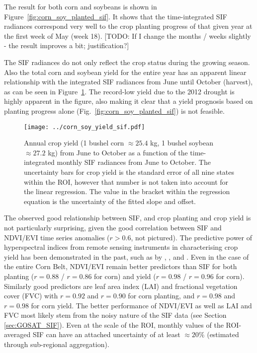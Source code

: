 \documentclass[preprint, a4paper, 10pt, times]{elsarticle}
\begin{document}
The result for both corn and soybeans is shown in Figure~\ref{fig:corn_soy_planted_sif}. It shows that the time-integrated SIF radiances correspond very well to the crop planting progress of that given year at the first week of May (week 18). [TODO: If I change the months / weeks slightly - the result improves a bit; justification?]

The SIF radiances do not only reflect the crop status during the growing season. Also the total corn and soybean yield for the entire year has an apparent linear relationship with the integrated SIF radiances from June until October (harvest), as can be seen in Figure~\ref{fig:corn_soy_yield_sif}. The record-low yield due to the 2012 drought is highly apparent in the figure, also making it clear that a yield prognosis based on planting progress alone (Fig.~\ref{fig:corn_soy_planted_sif}) is not feasible.

\begin{figure}[htbp]
\centering
\texttt{[image: ../corn\_soy\_yield\_sif.pdf]}
\caption{Annual crop yield (1 bushel corn $\approx 25.4$ kg, 1 bushel soybean $\approx 27.2$ kg) from June to October as a function of the time-integrated monthly SIF radiances from June to October. The uncertainty bars for crop yield is the standard error of all nine states within the ROI, however that number is not taken into account for the linear regression. The value in the bracket within the regression equation is the uncertainty of the fitted slope and offset.}
\label{fig:corn_soy_yield_sif}
\end{figure}

The observed good relationship between SIF, and crop planting and crop yield is not particularly surprising, given the good correlation between SIF and NDVI/EVI time series anomalies ($r > 0.6$, not pictured). The predictive power of hyperspectral indices from remote sensing instruments in characterising crop yield has been demonstrated in the past, such as by \citet{Shanahan2001}, \citet{Prasad2006}, \citet{Beckerreshef2010} and \citet{Mkhabela2011}. Even in the case of the entire Corn Belt, NDVI/EVI remain better predictors than SIF for both planting ($r = 0.88$ / $r = 0.86$ for corn) and yield ($r = 0.98$ / $r = 0.96$ for corn). Similarly good predictors are leaf area index (LAI) and fractional vegetation cover (FVC) with $r = 0.92$ and $r = 0.90$ for corn planting, and $r = 0.98$ and $r = 0.98$ for corn yield. The better performance of NDVI/EVI as well as LAI and FVC most likely stem from the noisy nature of the SIF data (see Section \ref{sec:GOSAT_SIF}). Even at the scale of the ROI, monthly values of the ROI-averaged SIF can have an attached uncertainty of at least $\approx 20\%$ (estimated through sub-regional aggregation).
\end{document}
